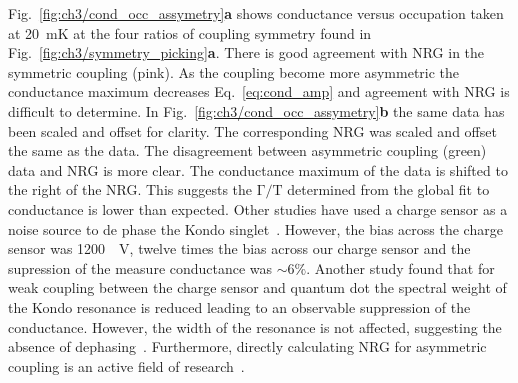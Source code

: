 Fig.~\ref{fig:ch3/cond_occ_assymetry}\textbf{a} shows conductance versus occupation taken at \qty{20}{mK} at the four ratios of coupling symmetry found in Fig.~\ref{fig:ch3/symmetry_picking}\textbf{a}. There is good agreement with NRG in the symmetric coupling (pink). As the coupling become more asymmetric the conductance maximum decreases Eq.~\ref{eq:cond_amp} and agreement with NRG is difficult to determine. In Fig.~\ref{fig:ch3/cond_occ_assymetry}\textbf{b} the same data has been scaled and offset for clarity. The corresponding NRG was scaled and offset the same as the data. The disagreement between asymmetric coupling (green) data and NRG is more clear. The conductance maximum of the data is shifted to the right of the NRG. This suggests the $\mathrm{\Gamma/T}$ determined from the global fit to conductance is lower than expected. Other studies have used a charge sensor as a noise source to de phase the Kondo singlet~\cite{kondo_controlled_dephasing}. However, the bias across the charge sensor was \qty{1200}{\mu V}, twelve times the bias across our charge sensor and the supression of the measure conductance was $\sim6\%$.
Another study found that for weak coupling between the charge sensor and quantum dot the spectral weight of the Kondo resonance is reduced leading to an observable suppression of the conductance. However, the width of the resonance is not affected, suggesting the absence of dephasing~\cite{peculiar_dephasing_of_kondo}. Furthermore, directly calculating NRG for asymmetric coupling is an active field of research~\cite{kondo_nrg_asymmetric}.






